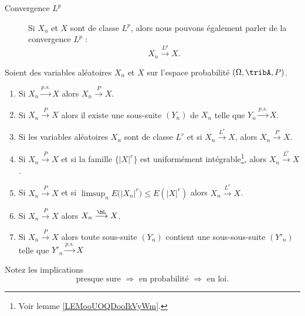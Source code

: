 \begin{definition}
\begin{description}
		\item[Convergence \( L^p\)]
			Si \( X_n\) et \( X\) sont de classe \( L^p\), alors nous pouvons également parler de la convergence \( L^p\) :
			\begin{equation}
				X_n\stackrel{ L^p}{\longrightarrow} X.
			\end{equation}
	\end{description}
\end{definition}

\begin{theorem}	\label{THOooMXFMooVHdSFE}
	Soient des variables aléatoires \( X_n\) et \( X\) sur l'espace probabilité \( (\Omega,\tribA,P)\).
	\begin{enumerate}
		\item
		      Si \( X_n\stackrel{ p.s.}{\longrightarrow} X\) alors \( X_n\stackrel{ P}{\longrightarrow} X\).
		\item		\label{ITEMooRPLIooHcFLCR}
		      Si \( X_n\stackrel{ P}{\longrightarrow} X\) alors il existe une sous-suite \( (Y_n) \) de \( X_n\) telle que \( Y_n\stackrel{ p.s.}{\longrightarrow} X\).
		\item
		      Si les variables aléatoires \( X_n\) sont de classe \( L^r\) et si \( X_n\stackrel{ L^r}{\longrightarrow} X\), alors \( X_n\stackrel{ P}{\longrightarrow} X\).
		\item	\label{ITEMooAYRCooCYLpWX}
		      Si \( X_n\stackrel{ P}{\longrightarrow} X\) et si la famille \( \{ | X |^r \}\) est uniformément intégrable\footnote{Voir lemme \ref{LEMooUOQDooIkVyWm}.}, alors \( X_n\stackrel{ L^r}{\longrightarrow} X\).
		\item
		      Si \( X_n\stackrel{ P}{\longrightarrow} X\) et si \( \limsup_{n}E\big( | X_n |^r \big)\leq E(| X |^r)\) alors \( X_n\stackrel{ L^r}{\longrightarrow} X\).
		\item
		      Si \( X_n\stackrel{ P}{\longrightarrow} X\) alors \( X_n\stackrel{ \hL}{\longrightarrow} X\).
		\item
		      Si \( X_n\stackrel{ P}{\longrightarrow} X\) alors toute sous-suite \( (Y_n)\) contient une sous-sous-suite \( (Y'_n)\) telle que \( Y'_n\stackrel{ p.s.}{\longrightarrow} X\)
	\end{enumerate}
	Notez les implications
	\begin{equation}
		\text{presque sure }\Rightarrow\text{ en probabilité }\Rightarrow\text{ en loi}.
	\end{equation}
\end{theorem}



